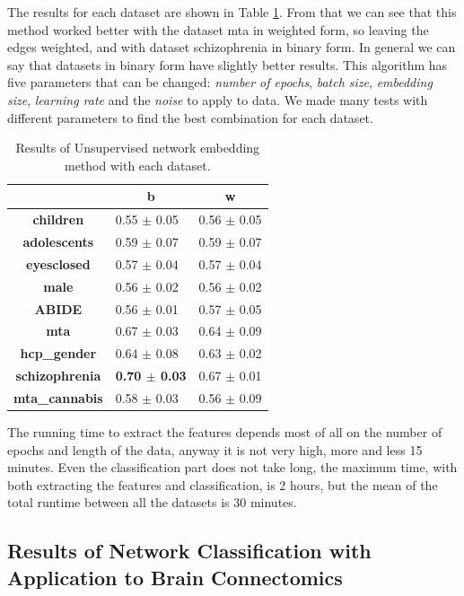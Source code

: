 The results for each dataset are shown in Table \ref{tab:embs}. From that we can see that this method worked better with the dataset mta in weighted form, so leaving the edges weighted, and with dataset schizophrenia in binary form. In general we can say that datasets in binary form have slightly better results. This algorithm has five parameters that can be changed: \textit{number of epochs}, \textit{batch size}, \textit{embedding size}, \textit{learning rate} and the \textit{noise} to apply to data. We made many tests with different parameters to find the best combination for each dataset.
\vspace{0.5cm}

\begin{table}
	\centering
	\begin{tabular}{c|l|c} 
		\toprule
		& \multicolumn{1}{c|}{b} & w                \\ 
		\midrule
		\textbf{children}      & 0.55 $\pm$ 0.05        & 0.56 $\pm$ 0.05  \\
		\textbf{adolescents}   & 0.59 $\pm$ 0.07        & 0.59 $\pm$ 0.07  \\
		\textbf{eyesclosed}    & 0.57 $\pm$ 0.04        & 0.57 $\pm$ 0.04  \\
		\textbf{male}          & 0.56 $\pm$ 0.02        & 0.56 $\pm$ 0.02  \\
		\textbf{ABIDE}         & 0.56 $\pm$ 0.01        & 0.57 $\pm$ 0.05  \\
		\textbf{mta}           & 0.67 $\pm$ 0.03        & 0.64 $\pm$ 0.09  \\
		\textbf{hcp\_gender}   & 0.64 $\pm$ 0.08        & 0.63 $\pm$ 0.02  \\
		\textbf{schizophrenia} & \textbf{0.70 $\pm$ 0.03}        & 0.67 $\pm$ 0.01  \\
		\textbf{mta\_cannabis} & 0.58 $\pm$ 0.03        & 0.56 $\pm$ 0.09 
	\end{tabular}
	\caption{Results of Unsupervised network embedding method with each dataset.}
	\label{tab:embs}
\end{table}

The running time to extract the features depends most of all on the number of epochs and length of the data, anyway it is not very high, more and less 15 minutes. Even the classification part does not take long, the maximum time, with both extracting the features and classification, is 2 hours, but the mean of the total runtime between all the datasets is 30 minutes.

\subsection{Results of Network Classification with Application to Brain Connectomics}


